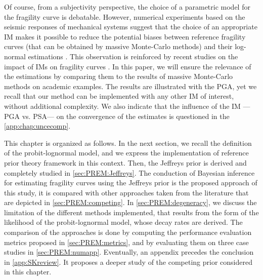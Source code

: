 Of course, from a subjectivity perspective, the choice of a parametric model for the fragility curve is debatable. However, numerical experiments based on the seismic responses of mechanical systems suggest that the choice of an appropriate IM makes it possible to reduce the potential biases between reference fragility curves (that can be obtained by massive Monte-Carlo methods) and their log-normal estimations \citep{gauchy_importance_2021}. This observation is reinforced by recent studies on the impact of IMs on fragility curves \citep{sainct_efficient_2020,ciano_role_2020,ciano_novel_2022}. In this paper, we will ensure the relevance of the estimations by comparing them to the results of massive Monte-Carlo methods on academic examples. 
The results are illustrated with the PGA, yet we recall that our method can be implemented with any other IM of interest, without additional complexity.
We also indicate that the influence of the IM ---PGA vs. PSA--- on the convergence of the estimates is questioned in the \cref{app:chap:uncecomp}.


This chapter is organized as follows. In the next section, we recall the definition of the probit-lognormal model, and we express the implementation of reference prior theory framework in this context.
Then, the Jeffreys prior is derived and completely studied in \cref{sec:PREM:Jeffreys}. The conduction of Bayesian inference for estimating fragility curves using the Jeffreys prior is the proposed approach of this study, it is compared with other approaches taken from the literature that are depicted in \cref{sec:PREM:competing}. %
In \cref{sec:PREM:degeneracy}, we discuss the limitation of the different methods implemented, that results from the form of the likelihood of the probit-lognormal model, whose decay rates are derived.
The comparison of the approaches is done by computing the performance evaluation metrics proposed in \cref{sec:PREM:metrics}, and by evaluating  them on three case studies in \cref{sec:PREM:numapp}.
Eventually, an appendix precedes the conclusion in \cref{app:SKreview}. It proposes a deeper study of the competing prior considered in this chapter.





